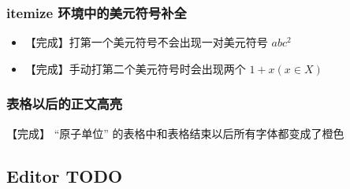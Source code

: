\subsubsection{itemize 环境中的美元符号补全}
\begin{itemize}
\item 【完成】打第一个美元符号不会出现一对美元符号 $abc^2$

\item 【完成】手动打第二个美元符号时会出现两个 $1 + x (x \in X)$
\end{itemize}

\subsubsection{表格以后的正文高亮}
【完成】 “原子单位” 的表格中和表格结束以后所有字体都变成了橙色

\subsection{Editor TODO}

